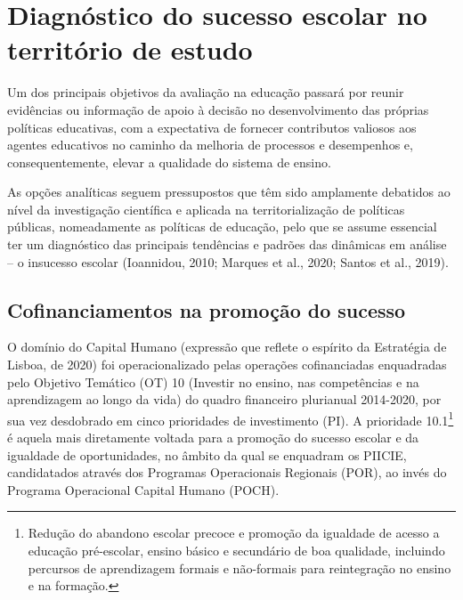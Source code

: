 \documentclass[
]{book}
\begin{document}
\hypertarget{diagnuxf3stico-do-sucesso-escolar-no-territuxf3rio-de-estudo}{%
\chapter{\texorpdfstring{\textbf{Diagnóstico do sucesso escolar no território de estudo}}{Diagnóstico do sucesso escolar no território de estudo}}\label{diagnuxf3stico-do-sucesso-escolar-no-territuxf3rio-de-estudo}}

Um dos principais objetivos da avaliação na educação passará por reunir evidências ou informação de apoio à decisão no desenvolvimento das próprias políticas educativas, com a expectativa de fornecer contributos valiosos aos agentes educativos no caminho da melhoria de processos e desempenhos e, consequentemente, elevar a qualidade do sistema de ensino.

As opções analíticas seguem pressupostos que têm sido amplamente debatidos ao nível da investigação científica e aplicada na territorialização de políticas públicas, nomeadamente as políticas de educação, pelo que se assume essencial ter um diagnóstico das principais tendências e padrões das dinâmicas em análise -- o insucesso escolar (Ioannidou, 2010; Marques et al., 2020; Santos et al., 2019).

\hypertarget{cofinanciamentos-na-promouxe7uxe3o-do-sucesso}{%
\section{\texorpdfstring{\textbf{Cofinanciamentos na promoção do sucesso}}{Cofinanciamentos na promoção do sucesso}}\label{cofinanciamentos-na-promouxe7uxe3o-do-sucesso}}

O domínio do Capital Humano (expressão que reflete o espírito da Estratégia de Lisboa, de 2020) foi operacionalizado pelas operações cofinanciadas enquadradas pelo Objetivo Temático (OT) 10 (Investir no ensino, nas competências e na aprendizagem ao longo da vida) do quadro financeiro plurianual 2014-2020, por sua vez desdobrado em cinco prioridades de investimento (PI). A prioridade 10.1\footnote{Redução do abandono escolar precoce e promoção da igualdade de acesso a educação pré-escolar, ensino básico e secundário de boa qualidade, incluindo percursos de aprendizagem formais e não-formais para reintegração no ensino e na formação.} é aquela mais diretamente voltada para a promoção do sucesso escolar e da igualdade de oportunidades, no âmbito da qual se enquadram os PIICIE, candidatados através dos Programas Operacionais Regionais (POR), ao invés do Programa Operacional Capital Humano (POCH).
\end{document}
